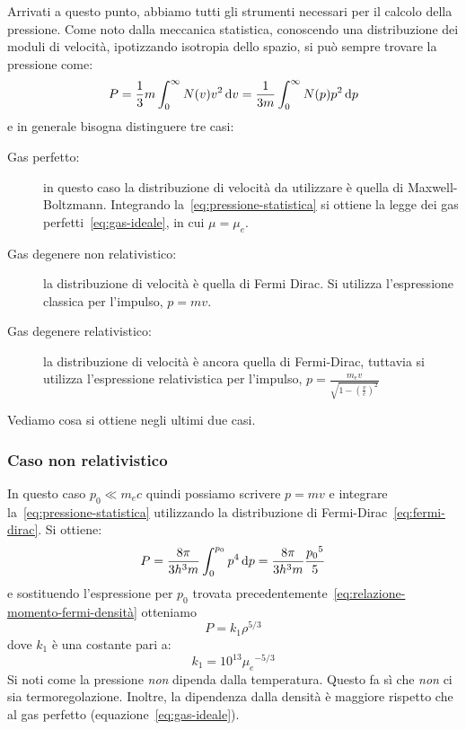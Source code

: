 Arrivati a questo punto, abbiamo tutti gli strumenti necessari per il calcolo della pressione. Come noto dalla meccanica statistica, conoscendo una distribuzione dei moduli di velocità, ipotizzando isotropia dello spazio, si può sempre trovare la pressione come:
\begin{equation}\label{eq:pressione-statistica}
    P = \frac{1}{3} m \int_0^\infty N(v) v^2 \mathop{\mathrm{{}d}}\mathopen{} v = \frac{1}{3m} \int_0^\infty N(p) p^2 \mathop{\mathrm{{}d}}\mathopen{} p
\end{equation}
e in generale bisogna distinguere tre casi:
\begin{description}
    \item[Gas perfetto:] in questo caso la distribuzione di velocità da utilizzare è quella di Maxwell-Boltzmann. Integrando la~\eqref{eq:pressione-statistica} si ottiene la legge dei gas perfetti~\eqref{eq:gas-ideale}, in cui $\mu = \mu_e$.
    \item[Gas degenere non relativistico:] la distribuzione di velocità è quella di Fermi Dirac. Si utilizza l'espressione classica per l'impulso, $p=mv$.
    \item[Gas degenere relativistico:] la distribuzione di velocità è ancora quella di Fermi-Dirac, tuttavia si utilizza l'espressione relativistica per l'impulso, $p= \frac{m_e v}{\sqrt{1- (\frac{v}{c})^2}}$
\end{description}

Vediamo cosa si ottiene negli ultimi due casi.

\subsubsection{Caso non relativistico}
In questo caso $p_0 \ll m_e c$ quindi possiamo scrivere $p=mv$ e integrare la~\eqref{eq:pressione-statistica} utilizzando la distribuzione di Fermi-Dirac~\eqref{eq:fermi-dirac}. Si ottiene:
\[
P = \dfrac{8\pi}{3h^3m} \int_0^{p_0} p^4 \mathop{\mathrm{{}d}}\mathopen{} p = \dfrac{8\pi}{3h^3m}\dfrac{{p_0}^5}{5}
\]
e sostituendo l'espressione per $p_0$ trovata precedentemente~\eqref{eq:relazione-momento-fermi-densità} otteniamo
\begin{equation}\label{eq:pressione-degenerazione-non-relativistica}
    P = k_1 \rho^{5/3}
\end{equation}
dove $k_1$ è una costante pari a:
\[
k_1 = 10^{13} {\mu_e}^{-5/3}
\]
Si noti come la pressione \emph{non} dipenda dalla temperatura. Questo fa sì che \emph{non} ci sia termoregolazione. Inoltre, la dipendenza dalla densità è maggiore rispetto che al gas perfetto (equazione~\eqref{eq:gas-ideale}).


